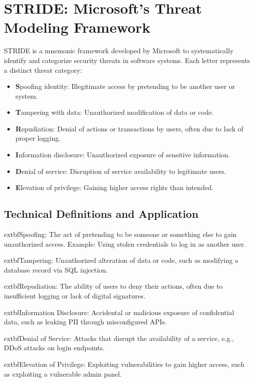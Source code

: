 
\section*{STRIDE: Microsoft’s Threat Modeling Framework}
STRIDE is a mnemonic framework developed by Microsoft to systematically identify and categorize security threats in software systems\cite{shostack2014}. Each letter represents a distinct threat category:
\begin{itemize}
	\item \textbf{S}poofing identity: Illegitimate access by pretending to be another user or system.
	\item \textbf{T}ampering with data: Unauthorized modification of data or code.
	\item \textbf{R}epudiation: Denial of actions or transactions by users, often due to lack of proper logging.
	\item \textbf{I}nformation disclosure: Unauthorized exposure of sensitive information.
	\item \textbf{D}enial of service: Disruption of service availability to legitimate users.
	\item \textbf{E}levation of privilege: Gaining higher access rights than intended.
\end{itemize}

\subsection*{Technical Definitions and Application}
	extbf{Spoofing:} The act of pretending to be someone or something else to gain unauthorized access. Example: Using stolen credentials to log in as another user.\cite{shostack2014}

	extbf{Tampering:} Unauthorized alteration of data or code, such as modifying a database record via SQL injection.\cite{owasp}

	extbf{Repudiation:} The ability of users to deny their actions, often due to insufficient logging or lack of digital signatures.\cite{nist800154}

	extbf{Information Disclosure:} Accidental or malicious exposure of confidential data, such as leaking PII through misconfigured APIs.\cite{uceda2015}

	extbf{Denial of Service:} Attacks that disrupt the availability of a service, e.g., DDoS attacks on login endpoints.\cite{owasp}

	extbf{Elevation of Privilege:} Exploiting vulnerabilities to gain higher access, such as exploiting a vulnerable admin panel.\cite{shostack2014}

